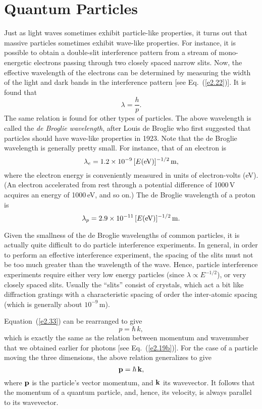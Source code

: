 \section{Quantum Particles}
Just as light waves sometimes exhibit particle-like properties, it turns
out that massive particles sometimes exhibit wave-like properties.
For instance, it is possible to obtain a double-slit interference pattern
from a stream of mono-energetic electrons passing through two closely
spaced narrow slits. Now,  the
effective wavelength of the electrons can be determined by measuring the width of the light and
dark bands in the interference pattern [see Eq.~(\ref{e2.22})]. It is found that
\begin{equation}\label{e2.33}
\lambda = \frac{h}{p}.
\end{equation}
The same relation is found for other types of particles. The above
wavelength is called the {\em de Broglie wavelength}, after Louis de Broglie
who first suggested that particles should have wave-like properties in 1923.
Note that the de Broglie wavelength is generally pretty small. For instance,
that of an electron is
\begin{equation}
\lambda_e = 1.2\times 10^{-9}\,[E({\rm eV})]^{-1/2}\,{\rm m},
\end{equation}
where the electron energy is conveniently measured in units of electron-volts (eV). 
(An electron accelerated from rest through a potential difference of 1000\,V
acquires an energy of 1000\,eV, and so on.) The de Broglie wavelength
of a proton is
\begin{equation}
\lambda_p = 2.9\times 10^{-11}\,[E({\rm eV})]^{-1/2}\,{\rm m}.
\end{equation}

Given the smallness of the de Broglie wavelengths of common particles,
it is actually quite difficult to do particle interference experiments. 
In general, in order to perform an  effective interference experiment, the spacing
of the slits must not be too much greater than the wavelength of the wave. 
Hence, particle interference experiments require either very low energy particles (since
$\lambda\propto E^{-1/2}$), or very closely spaced slits. Usually
the ``slits'' consist of crystals, which act a bit like diffraction gratings
with a characteristic spacing of order the inter-atomic spacing (which is
generally about $10^{-9}$\,m).

Equation~(\ref{e2.33}) can be rearranged to give
\begin{equation}\label{e2.36}
p = \hbar\,k,
\end{equation}
which is exactly the same as the relation between momentum and
wavenumber that we obtained earlier for photons [see Eq.~(\ref{e2.19b})].
For the case of a particle moving the three dimensions, the above
relation generalizes  to give
\begin{equation}
{\bf p} = \hbar\,{\bf k},
\end{equation}
where ${\bf p}$ is the particle's vector momentum, and ${\bf k}$ its wavevector.
It follows that the momentum of a quantum particle, and, hence, its velocity, is always parallel to its wavevector. 

